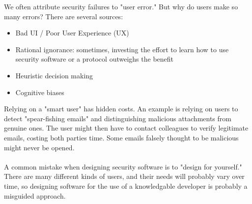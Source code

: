 We often attribute security failures to "user error." But why do users make so many errors? There are several sources:
\begin{itemize}
    \item Bad UI / Poor User Experience (UX)
    \item Rational ignorance: sometimes, investing the effort to learn how to use security software or a protocol outweighs the benefit
    \item Heuristic decision making
    \item Cognitive biases
\end{itemize}

Relying on a "smart user" has hidden costs. An example is relying on users to detect "spear-fishing emails" and distinguishing malicious attachments from genuine ones. The user might then have to contact colleagues to verify legitimate emails, costing both parties time. Some emails falsely thought to be malicious might never be opened. 
\\
\\
A common mistake when designing security software is to "design for yourself." There are many different kinds of users, and their needs will probably vary over time, so designing software for the use of a knowledgable developer is probably a misguided approach. 

